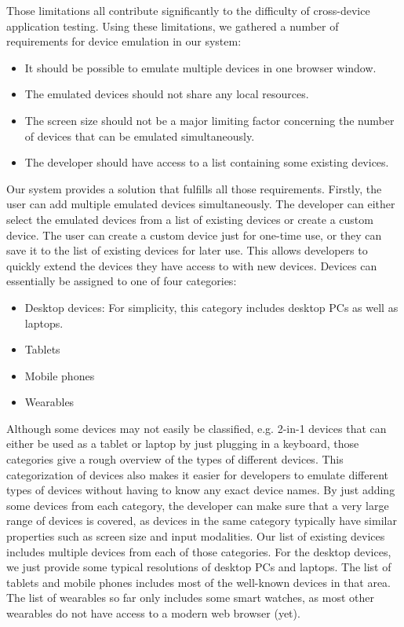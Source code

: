 Those limitations all contribute significantly to the difficulty of cross-device application testing. Using these limitations, we gathered a number of requirements for device emulation in our system:
\begin{itemize}
	\item It should be possible to emulate multiple devices in one browser window.
	\item The emulated devices should not share any local resources.
	\item The screen size should not be a major limiting factor concerning the number of devices that can be emulated simultaneously.
	\item The developer should have access to a list containing some existing devices.
\end{itemize}

Our system provides a solution that fulfills all those requirements. Firstly, the user can add multiple emulated devices simultaneously. The developer can either select the emulated devices from a list of existing devices or create a custom device. The user can create a custom device just for one-time use, or they can save it to the list of existing devices for later use. This allows developers to quickly extend the devices they have access to with new devices. Devices can essentially be assigned to one of four categories:
\begin{itemize}
	\item Desktop devices: For simplicity, this category includes desktop PCs as well as laptops.
	\item Tablets
	\item Mobile phones
	\item Wearables
\end{itemize}
Although some devices may not easily be classified, e.g. 2-in-1 devices that can either be used as a tablet or laptop by just plugging in a keyboard, those categories give a rough overview of the types of different devices. This categorization of devices also makes it easier for developers to emulate different types of devices without having to know any exact device names. By just adding some devices from each category, the developer can make sure that a very large range of devices is covered, as devices in the same category typically have similar properties such as screen size and input modalities. Our list of existing devices includes multiple devices from each of those categories. For the desktop devices, we just provide some typical resolutions of desktop PCs and laptops. The list of tablets and mobile phones includes most of the well-known devices in that area. The list of wearables so far only includes some smart watches, as most other wearables do not have access to a modern web browser (yet).

